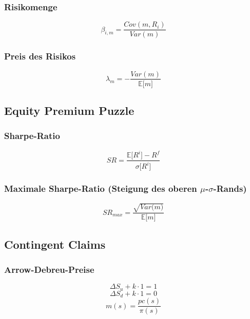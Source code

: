 \subsubsection{Risikomenge}
\begin{equation}
	\beta_{i,m} = \frac{Cov(m,R_i)}{Var(m)}\label{eq:beta}
\end{equation}

\subsubsection{Preis des Risikos}
\begin{equation}
	\lambda_m = - \frac{Var(m)}{\mathbb{E} \big\lbrack m \big\rbrack}
\end{equation}


\subsection{Equity Premium Puzzle}

\subsubsection{Sharpe-Ratio}
\begin{equation}
	SR = \frac{\mathbb{E} \big\lbrack R^i \big\rbrack - R^f}{\sigma \big\lbrack R^i \big\rbrack}
\end{equation}

\subsubsection{Maximale Sharpe-Ratio (Steigung des oberen \(\mu\)-\(\sigma\)-Rands)}
\begin{equation}
	SR_{max} = \frac{\sqrt{Var \big( m \big)}}{\mathbb{E} \big\lbrack m \big\rbrack}
\end{equation}


\subsection{Contingent Claims}

\subsubsection{Arrow-Debreu-Preise}
\begin{equation}
	\Delta S_u + k \cdot 1 = 1 \label{eq:adp1}
\end{equation}
\begin{equation}
	\Delta S_d + k \cdot 1 = 0 \label{eq:adp2}
\end{equation}
\begin{equation}
	m(s) = \frac{pc(s)}{\pi(s)} \label{eq:adpm}
\end{equation}
